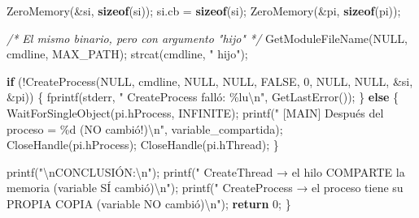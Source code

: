 \documentclass[
  spanish,
]{article}
\newenvironment{Shaded}{}{}
\newcommand{\CommentTok}[1]{\textcolor[rgb]{0.38,0.63,0.69}{\textit{#1}}}
\newcommand{\ControlFlowTok}[1]{\textcolor[rgb]{0.00,0.44,0.13}{\textbf{#1}}}
\newcommand{\DecValTok}[1]{\textcolor[rgb]{0.25,0.63,0.44}{#1}}
\newcommand{\KeywordTok}[1]{\textcolor[rgb]{0.00,0.44,0.13}{\textbf{#1}}}
\newcommand{\NormalTok}[1]{#1}
\newcommand{\OperatorTok}[1]{\textcolor[rgb]{0.40,0.40,0.40}{#1}}
\newcommand{\SpecialCharTok}[1]{\textcolor[rgb]{0.25,0.44,0.63}{#1}}
\newcommand{\StringTok}[1]{\textcolor[rgb]{0.25,0.44,0.63}{#1}}
\begin{document}
\begin{Shaded}
\begin{Highlighting}[]
\NormalTok{    ZeroMemory}\OperatorTok{(\&}\NormalTok{si}\OperatorTok{,} \KeywordTok{sizeof}\OperatorTok{(}\NormalTok{si}\OperatorTok{));}
\NormalTok{    si}\OperatorTok{.}\NormalTok{cb }\OperatorTok{=} \KeywordTok{sizeof}\OperatorTok{(}\NormalTok{si}\OperatorTok{);}
\NormalTok{    ZeroMemory}\OperatorTok{(\&}\NormalTok{pi}\OperatorTok{,} \KeywordTok{sizeof}\OperatorTok{(}\NormalTok{pi}\OperatorTok{));}

    \CommentTok{/* El mismo binario, pero con argumento "hijo" */}
\NormalTok{    GetModuleFileName}\OperatorTok{(}\NormalTok{NULL}\OperatorTok{,}\NormalTok{ cmdline}\OperatorTok{,}\NormalTok{ MAX\_PATH}\OperatorTok{);}
\NormalTok{    strcat}\OperatorTok{(}\NormalTok{cmdline}\OperatorTok{,} \StringTok{" hijo"}\OperatorTok{);}

    \ControlFlowTok{if} \OperatorTok{(!}\NormalTok{CreateProcess}\OperatorTok{(}\NormalTok{NULL}\OperatorTok{,}\NormalTok{ cmdline}\OperatorTok{,}\NormalTok{ NULL}\OperatorTok{,}\NormalTok{ NULL}\OperatorTok{,}\NormalTok{ FALSE}\OperatorTok{,} \DecValTok{0}\OperatorTok{,}
\NormalTok{                       NULL}\OperatorTok{,}\NormalTok{ NULL}\OperatorTok{,} \OperatorTok{\&}\NormalTok{si}\OperatorTok{,} \OperatorTok{\&}\NormalTok{pi}\OperatorTok{))}
    \OperatorTok{\{}
\NormalTok{        fprintf}\OperatorTok{(}\NormalTok{stderr}\OperatorTok{,} \StringTok{"  CreateProcess falló: }\SpecialCharTok{\%lu\textbackslash{}n}\StringTok{"}\OperatorTok{,}\NormalTok{ GetLastError}\OperatorTok{());}
    \OperatorTok{\}} \ControlFlowTok{else} \OperatorTok{\{}
\NormalTok{        WaitForSingleObject}\OperatorTok{(}\NormalTok{pi}\OperatorTok{.}\NormalTok{hProcess}\OperatorTok{,}\NormalTok{ INFINITE}\OperatorTok{);}
\NormalTok{        printf}\OperatorTok{(}\StringTok{"  [MAIN]  Después del proceso = }\SpecialCharTok{\%d}\StringTok{  (NO cambió!)}\SpecialCharTok{\textbackslash{}n}\StringTok{"}\OperatorTok{,}
\NormalTok{               variable\_compartida}\OperatorTok{);}
\NormalTok{        CloseHandle}\OperatorTok{(}\NormalTok{pi}\OperatorTok{.}\NormalTok{hProcess}\OperatorTok{);}
\NormalTok{        CloseHandle}\OperatorTok{(}\NormalTok{pi}\OperatorTok{.}\NormalTok{hThread}\OperatorTok{);}
    \OperatorTok{\}}

\NormalTok{    printf}\OperatorTok{(}\StringTok{"}\SpecialCharTok{\textbackslash{}n}\StringTok{CONCLUSIÓN:}\SpecialCharTok{\textbackslash{}n}\StringTok{"}\OperatorTok{);}
\NormalTok{    printf}\OperatorTok{(}\StringTok{"  CreateThread → el hilo COMPARTE la memoria (variable SÍ cambió)}\SpecialCharTok{\textbackslash{}n}\StringTok{"}\OperatorTok{);}
\NormalTok{    printf}\OperatorTok{(}\StringTok{"  CreateProcess → el proceso tiene su PROPIA COPIA (variable NO cambió)}\SpecialCharTok{\textbackslash{}n}\StringTok{"}\OperatorTok{);}
    \ControlFlowTok{return} \DecValTok{0}\OperatorTok{;}
\OperatorTok{\}}
\end{Highlighting}
\end{Shaded}
\end{document}
